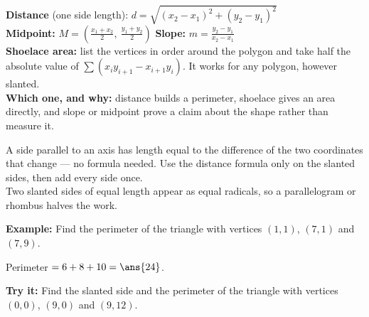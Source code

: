 \documentclass[12pt]{article}
\begin{document}

\begin{formulabox}
\textbf{Distance} (one side length):
$d = \sqrt{(x_2 - x_1)^2 + (y_2 - y_1)^2}$\\[3pt]
\textbf{Midpoint:} $M = \left(\tfrac{x_1+x_2}{2},\ \tfrac{y_1+y_2}{2}\right)$
\qquad
\textbf{Slope:} $m = \tfrac{y_2-y_1}{x_2-x_1}$\\[3pt]
\textbf{Shoelace area:} list the vertices in order around the polygon and take
half the absolute value of $\sum (x_i y_{i+1} - x_{i+1} y_i)$. It works for
any polygon, however slanted.\\[3pt]
\textbf{Which one, and why:} distance builds a perimeter, shoelace gives an
area directly, and slope or midpoint prove a claim about the shape rather than
measure it.
\end{formulabox}


\begin{formulabox}
A side parallel to an axis has length equal to the difference of the two
coordinates that change --- no formula needed. Use the distance formula only on
the slanted sides, then add every side once.\\[3pt]
Two slanted sides of equal length appear as equal radicals, so a parallelogram
or rhombus halves the work.
\end{formulabox}

\begin{examplebox}
\textbf{Example:} Find the perimeter of the triangle with vertices $(1,1)$,
$(7,1)$ and $(7,9)$.

Perimeter $= 6 + 8 + 10 = \ans{24}$.
\end{examplebox}

\begin{tryitbox}
\textbf{Try it:} Find the slanted side and the perimeter of the triangle with
vertices $(0,0)$, $(9,0)$ and $(9,12)$.\\[2pt]
\end{tryitbox}

\end{document}
